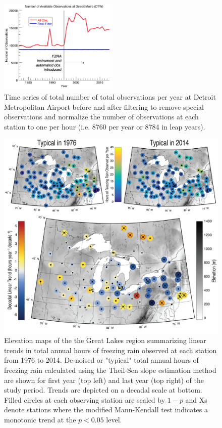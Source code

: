\documentclass[twocol]{ametsoc}
\begin{document}
\begin{figure}
\centering
\includegraphics[width=0.5\textwidth]{Filtering_Plot.png}
\caption{\label{fig:trendmap}Time series of total number of total observations per year at Detroit Metropolitan Airport before and after filtering to remove special observations and normalize the number of observations at each station to one per hour (i.e. 8760 per year or 8784 in leap years).}
\end{figure}

\begin{figure}
\centering
\includegraphics[width=1.0\textwidth]{FZRA_Trend_Maps.png}
\caption{\label{fig:trendmap}Elevation maps of the the Great Lakes region summarizing linear trends in total annual hours of freezing rain observed at each station from 1976 to 2014. De-noised or "typical" total annual hours of freezing rain calculated using the Theil-Sen slope estimation method are shown for first year (top left) and last year (top right) of the study period. Trends are depicted on a decadal scale at bottom. Filled circles at each observing station are scaled by $1 - p$ and Xs denote stations where the modified Mann-Kendall test indicates a monotonic trend at the $p<0.05$ level.}
\end{figure}
\end{document}
